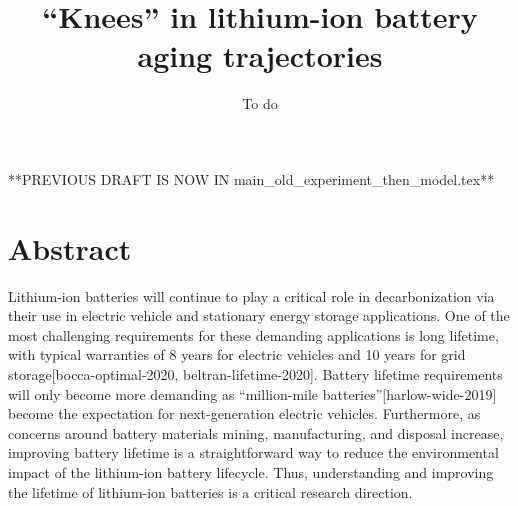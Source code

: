 \documentclass[journal=jpcl, manuscript=article, layout=onecolumn]{achemso}
\title{``Knees'' in lithium-ion battery aging trajectories}
\author{To do}
\date{}
\newcommand{\pbox}[1]{{
\fbox{
\parbox{0.8\textwidth}{  \fbox{$\triangleright$\textcolor{blue}{\textbf{From Peter}:}} 
#1
}}}}
\begin{document}
\maketitle

**PREVIOUS DRAFT IS NOW IN main\_old\_experiment\_then\_model.tex**

\section{Abstract}

\pbox{To do}

\newpage

Lithium-ion batteries will continue to play a critical role in decarbonization via their use in electric vehicle and stationary energy storage applications. One of the most challenging requirements for these demanding applications is long lifetime, with typical warranties of 8 years for electric vehicles and 10 years for grid storage\cite{hesse_lithium-ion_2017}[bocca-optimal-2020, beltran-lifetime-2020]. Battery lifetime requirements will only become more demanding as “million-mile batteries”[harlow-wide-2019] become the expectation for next-generation electric vehicles. Furthermore, as concerns around battery materials mining, manufacturing, and disposal increase, improving battery lifetime is a straightforward way to reduce the environmental impact of the lithium-ion battery lifecycle. Thus, understanding and improving the lifetime of lithium-ion batteries is a critical research direction.
\end{document}
